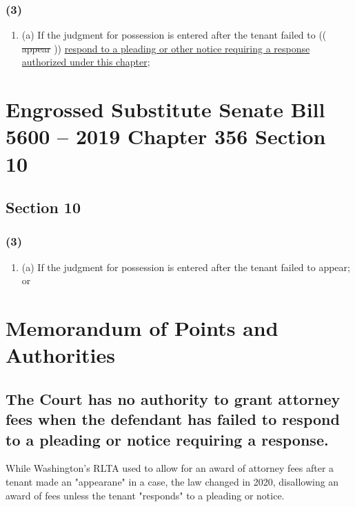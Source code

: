\documentclass[11pt]{article}
\begin{document}
\subsubsection{(3)}
\label{sec:orga066759}

\begin{enumerate}
\item (a)
\label{sec:orgdd9c234}
If the judgment for possession is entered after the tenant failed to (( \sout{appear} )) \uline{respond to a pleading or other notice requiring a response authorized under this chapter};
\end{enumerate}

\section{Engrossed Substitute Senate Bill 5600 -- 2019 Chapter 356 Section 10}
\label{sec:org50962df}

\subsection{Section 10}
\label{sec:orga1bdf2c}

\subsubsection{(3)}
\label{sec:org66ffd64}

\begin{enumerate}
\item (a)
\label{sec:org8c72a2f}
If the judgment for possession is entered after the tenant failed to appear; or
\end{enumerate}

\section{Memorandum of Points and Authorities}
\label{sec:org913a653}

\subsection{The Court has no authority to grant attorney fees when the defendant has failed to respond to a pleading or notice requiring a response.}
\label{sec:orgbfcc7d3}

While Washington's RLTA used to allow for an award of attorney fees after a tenant made an "appearane" in a case, the law changed in 2020, disallowing an award of fees unless the
tenant "responds" to a pleading or notice.
\end{document}
